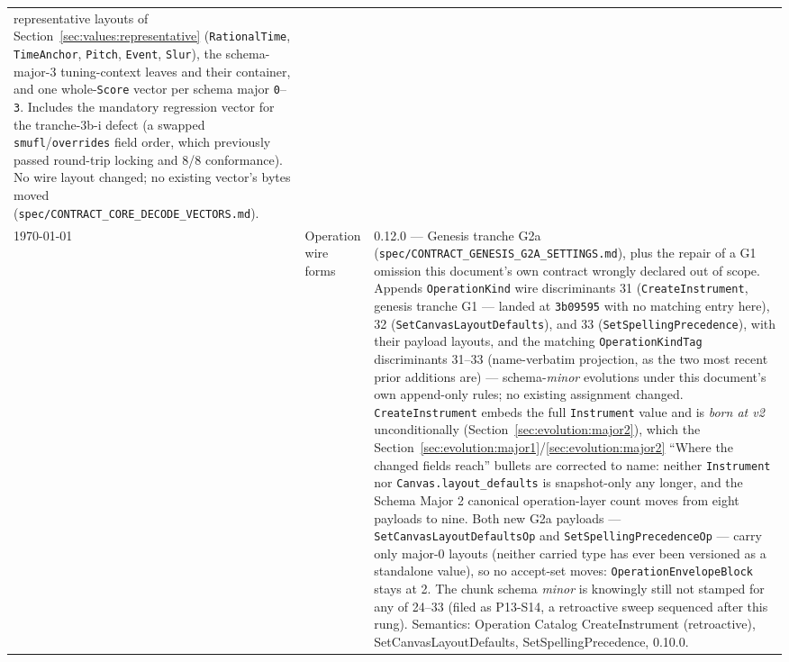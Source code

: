 \documentclass[11pt,letterpaper]{report}
\newcommand{\tablenums}[1]{{\addfontfeatures{Numbers={Lining,Tabular}}#1}}
\newcommand{\sectionsc}[1]{{\addfontfeatures{Letters=SmallCaps}#1}}
\begin{document}
\begin{longtable}{p{2cm} p{2.5cm} p{9cm}}
  representative layouts of Section~\ref{sec:values:representative}
  (\texttt{RationalTime}, \texttt{TimeAnchor}, \texttt{Pitch}, \texttt{Event},
  \texttt{Slur}), the schema-major-3 tuning-context leaves and their
  container, and one whole-\texttt{Score} vector per schema major
  \texttt{0}--\texttt{3}. Includes the mandatory regression vector for the
  tranche-3b-i defect (a swapped \texttt{smufl}/\texttt{overrides} field
  order, which previously passed round-trip locking and 8/8 conformance).
  No wire layout changed; no existing vector's bytes moved
  (\texttt{spec/CONTRACT\_CORE\_DECODE\_VECTORS.md}). \\
    \today & Operation wire forms & 0.12.0 --- Genesis tranche G2a
  (\texttt{spec/CONTRACT\_GENESIS\_G2A\_SETTINGS.md}), plus the repair of a
  G1 omission this document's own contract wrongly declared out of scope.
  Appends \texttt{OperationKind} wire discriminants \tablenums{31}
  (\texttt{CreateInstrument}, genesis tranche G1 --- landed at
  \texttt{3b09595} with no matching entry here), \tablenums{32}
  (\texttt{SetCanvasLayoutDefaults}), and \tablenums{33}
  (\texttt{SetSpellingPrecedence}), with their payload layouts, and the
  matching \texttt{OperationKindTag} discriminants \tablenums{31}--\tablenums{33}
  (name-verbatim projection, as the two most recent prior additions are) ---
  schema-\emph{minor} evolutions under this document's own append-only
  rules; no existing assignment changed. \texttt{CreateInstrument} embeds
  the full \texttt{Instrument} value and is \emph{born at v2}
  unconditionally (Section~\ref{sec:evolution:major2}), which the
  Section~\ref{sec:evolution:major1}/\ref{sec:evolution:major2}
  ``Where the changed fields reach'' bullets are corrected to name: neither
  \texttt{Instrument} nor \texttt{Canvas.layout\_defaults} is
  snapshot-only any longer, and the \sectionsc{Schema Major 2} canonical
  operation-layer count moves from eight payloads to nine. Both new G2a
  payloads --- \texttt{SetCanvasLayoutDefaultsOp} and
  \texttt{SetSpellingPrecedenceOp} --- carry only major-0 layouts (neither
  carried type has ever been versioned as a standalone value), so no
  accept-set moves: \texttt{OperationEnvelopeBlock} stays at
  \tablenums{2}. The chunk schema \emph{minor} is knowingly still not
  stamped for any of \tablenums{24}--\tablenums{33} (filed as P13-S14, a
  retroactive sweep sequenced after this rung). Semantics: Operation
  Catalog \sectionsc{CreateInstrument} (retroactive),
  \sectionsc{SetCanvasLayoutDefaults}, \sectionsc{SetSpellingPrecedence},
  0.10.0. \\

\end{longtable}
\end{document}
